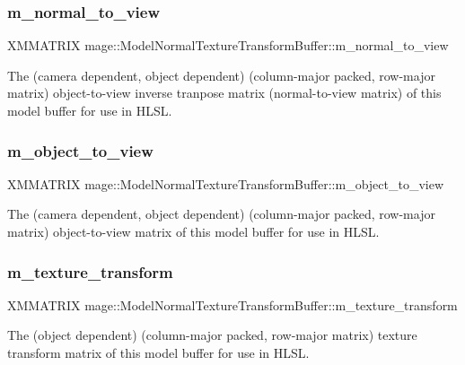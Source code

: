 \subsubsection{\texorpdfstring{m\+\_\+normal\+\_\+to\+\_\+view}{m\_normal\_to\_view}}
{\footnotesize\ttfamily X\+M\+M\+A\+T\+R\+IX mage\+::\+Model\+Normal\+Texture\+Transform\+Buffer\+::m\+\_\+normal\+\_\+to\+\_\+view}

The (camera dependent, object dependent) (column-\/major packed, row-\/major matrix) object-\/to-\/view inverse tranpose matrix (normal-\/to-\/view matrix) of this model buffer for use in H\+L\+SL. \hypertarget{structmage_1_1_model_normal_texture_transform_buffer_ad7529c313b070994419a129476db4308}{}\label{structmage_1_1_model_normal_texture_transform_buffer_ad7529c313b070994419a129476db4308} 
\subsubsection{\texorpdfstring{m\+\_\+object\+\_\+to\+\_\+view}{m\_object\_to\_view}}
{\footnotesize\ttfamily X\+M\+M\+A\+T\+R\+IX mage\+::\+Model\+Normal\+Texture\+Transform\+Buffer\+::m\+\_\+object\+\_\+to\+\_\+view}

The (camera dependent, object dependent) (column-\/major packed, row-\/major matrix) object-\/to-\/view matrix of this model buffer for use in H\+L\+SL. \hypertarget{structmage_1_1_model_normal_texture_transform_buffer_a702a55ad742e74f29c57582dd2686864}{}\label{structmage_1_1_model_normal_texture_transform_buffer_a702a55ad742e74f29c57582dd2686864} 
\subsubsection{\texorpdfstring{m\+\_\+texture\+\_\+transform}{m\_texture\_transform}}
{\footnotesize\ttfamily X\+M\+M\+A\+T\+R\+IX mage\+::\+Model\+Normal\+Texture\+Transform\+Buffer\+::m\+\_\+texture\+\_\+transform}

The (object dependent) (column-\/major packed, row-\/major matrix) texture transform matrix of this model buffer for use in H\+L\+SL. 